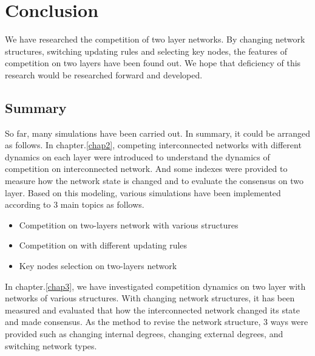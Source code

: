
\chapter{Conclusion}
\label{chap6}
We have researched the competition of two layer networks. By changing network structures, switching updating rules and selecting key nodes, the features of competition on two layers have been found out. We hope that deficiency of this research would be researched forward and developed. 
\section{Summary}
So far, many simulations have been carried out. In summary, it could be arranged as follows. 
In chapter.\ref{chap2}, competing interconnected networks with different dynamics on each layer were introduced to understand the dynamics of competition on interconnected network.  And some indexes were provided to measure how the network state is changed and to evaluate the consensus on two layer. Based on this modeling, various simulations have been implemented according to 3 main topics as follows.
\begin{itemize}
\item Competition on two-layers network with various structures
\item Competition on with different updating rules
\item Key nodes selection on two-layers network
\end{itemize}
In chapter.\ref{chap3}, we have investigated competition dynamics on two layer with networks of various structures. With changing network structures, it has been measured and evaluated that how the interconnected network changed its state and made consensus. As the method to revise the network structure, 3 ways were provided such as changing internal degrees, changing external degrees, and switching network types. 
